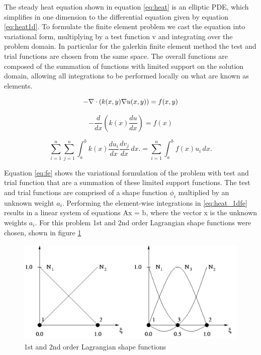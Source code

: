 \documentclass[12pt]{article}
\begin{document}
The steady heat equation shown in equation \ref{eq:heat} is an elliptic PDE, which simplifies in one dimension to the differential equation given by equation \ref{eq:heat1d}.  To formulate the finite element problem we cast the equation into variational form, multiplying by a test function v and integrating over the problem domain.  In particular for the galerkin finite element method the test and trial functions are chosen from the same space.  The overall functions are composed of the summation of functions with limited support on the solution domain, allowing all integrations to be performed locally on what are known as elements.

\begin{equation}
\label{eq:heat}
   -\nabla \cdot \left(k(x,y)\nabla u(x,y) \right) = f(x,y)\\
\end{equation} 

\begin{equation}
\label{eq:heat1d}
    -\frac{d}{dx}\left(k(x)\frac{du}{dx}\right) = f(x) 
\end{equation} 

\begin{equation}
\label{eq:fe}
 \sum_{i = 1}^n\sum_{j = 1}^n \int_a^b k(x)\frac{du_i}{dx}\frac{dv_j}{dx}\,dx. = \sum_{i = 1}^n\int_a^b f(x)u_i\,dx.
\end{equation}

Equation \ref{eq:fe} shows the variational formulation of the problem with test and trial function that are a summation of these limited support functions.  The test and trial functions are comprised of a shape function $\phi_i$ multiplied by an unknown weight $a_i$.  Performing the element-wise integrations in \ref{eq:heat_1dfe} results in a linear system of equations Ax = b, where the vector x is the unknown weights $a_i$.  For this problem 1st and 2nd order Lagrangian shape functions were chosen, shown in figure \ref{fig:shape}

\begin{figure}[!htbp] 
   \centering
\label{fig:shape}
\includegraphics[height = 5cm]{shapes.png}
\caption{1st and 2nd order Lagrangian shape functions \cite{radi_shape_func}}
\end{figure}
\end{document}
